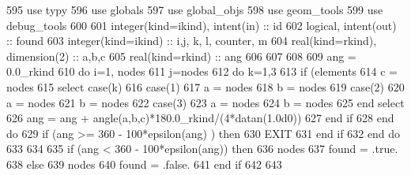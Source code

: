 \begin{DoxyCode}
595         \textcolor{keywordtype}{use }typy
596         \textcolor{keywordtype}{use }globals
597         \textcolor{keywordtype}{use }global_objs
598         \textcolor{keywordtype}{use }geom_tools
599         \textcolor{keywordtype}{use }debug_tools
600 
601         \textcolor{keywordtype}{integer(kind=ikind)}, \textcolor{keywordtype}{intent(in)} :: id
602         \textcolor{keywordtype}{logical}, \textcolor{keywordtype}{intent(out)} :: found
603         \textcolor{keywordtype}{integer(kind=ikind)} :: i,j, k, l, counter, m
604         \textcolor{keywordtype}{real(kind=rkind)}, \textcolor{keywordtype}{dimension(2)} :: a,b,c
605         \textcolor{keywordtype}{real(kind=rkind)} :: ang
606 
607 
608 
609         ang = 0.0\_rkind
610         \textcolor{keywordflow}{do} i=1, nodes%
611           j=nodes%
612           \textcolor{keywordflow}{do} k=1,3
613             \textcolor{keywordflow}{if} (elements%
614               c = nodes%
615               \textcolor{keywordflow}{select case}(k)
616                 \textcolor{keywordflow}{case}(1)
617                       a = nodes%
618                       b = nodes%
619                 \textcolor{keywordflow}{case}(2)
620                       a = nodes%
621                       b = nodes%
622                 \textcolor{keywordflow}{case}(3)
623                       a = nodes%
624                       b = nodes%
625 \textcolor{keywordflow}{              end select}
626               ang = ang + angle(a,b,c)*180.0\_rkind/(4*datan(1.0d0))
627 \textcolor{keywordflow}{            end if}
628 \textcolor{keywordflow}{          end do}
629           \textcolor{keywordflow}{if} (ang >= 360 - 100*epsilon(ang) ) \textcolor{keywordflow}{then}
630             \textcolor{keywordflow}{EXIT}
631 \textcolor{keywordflow}{          end if}
632 \textcolor{keywordflow}{        end do}
633 
634 
635         \textcolor{keywordflow}{if} (ang < 360 - 100*epsilon(ang)) \textcolor{keywordflow}{then}
636           nodes%
637           found = .true.
638         \textcolor{keywordflow}{else}
639           nodes%
640           found = .false.
641 \textcolor{keywordflow}{        end if}
642 
643 
\end{DoxyCode}


